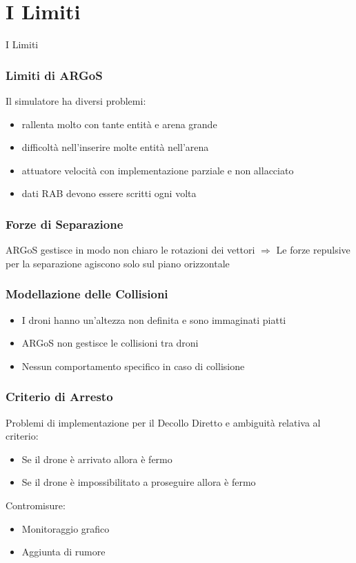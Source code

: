 \documentclass{beamer}
\begin{document}
\section{I Limiti}
\begin{frame}
\centering
\Huge
I Limiti
\end{frame}

\begin{frame}
\frametitle{Limiti di ARGoS}
Il simulatore ha diversi problemi:

\begin{itemize}
  \item rallenta molto con tante entit\`a e arena grande
  \item difficolt\`a nell'inserire molte entit\`a nell'arena
  \item attuatore velocit\`a con implementazione parziale e non allacciato
  \item dati RAB devono essere scritti ogni volta
\end{itemize}
\end{frame}

\begin{frame}
\frametitle{Forze di Separazione}
ARGoS gestisce in modo non chiaro le rotazioni dei vettori $\Rightarrow$ Le forze repulsive per la separazione agiscono solo sul piano orizzontale
\end{frame}

\begin{frame}
\frametitle{Modellazione delle Collisioni}
\begin{itemize}
  \item I droni hanno un'altezza non definita e sono immaginati piatti
  \item ARGoS non gestisce le collisioni tra droni
  \item Nessun comportamento specifico in caso di collisione
\end{itemize}
\end{frame}

\begin{frame}
\frametitle{Criterio di Arresto}
Problemi di implementazione per il Decollo Diretto e ambiguit\`a relativa al criterio:
\begin{itemize}
  \item Se il drone \`e arrivato allora \`e fermo
  \item Se il drone \`e impossibilitato a proseguire allora \`e fermo
\end{itemize}

Contromisure:
\begin{itemize}
  \item Monitoraggio grafico
  \item Aggiunta di rumore
\end{itemize}
\end{frame}
\end{document}
